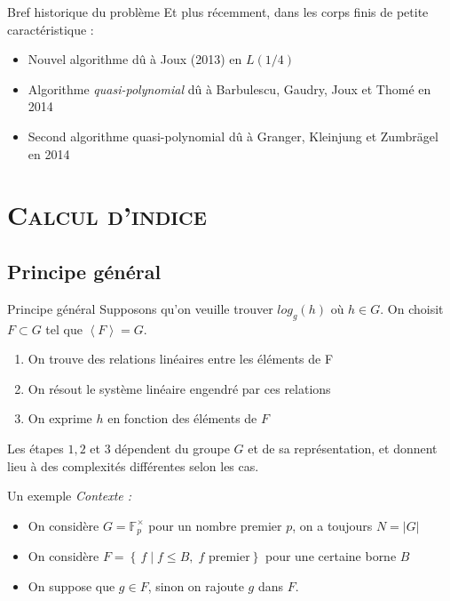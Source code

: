 \documentclass[xcolor=x11names,compress]{beamer}
\theoremstyle{break}
\theoremstyle{sc}
\theoremstyle{definition}
\theoremstyle{remark}
\begin{document}
\begin{frame}{Bref historique du problème}
  Et plus récemment, dans les corps finis de petite caractéristique :
  \begin{itemize}
    \item Nouvel algorithme dû à Joux (2013) en $L(1/4)$
    \item Algorithme \emph{quasi-polynomial} dû à Barbulescu, Gaudry, Joux et
      Thomé en 2014
    \item Second algorithme quasi-polynomial dû à Granger, Kleinjung et
      Zumbrägel en 2014
  \end{itemize}
\end{frame}

\section{\scshape Calcul d'indice}
\subsection{Principe général}
\begin{frame}{Principe général}
  Supposons qu'on veuille trouver $log_g(h)$ où $h\in G$. On choisit $F\subset G$ tel que $\left\langle F \right\rangle = G$.
  \begin{enumerate}
    \item On trouve des relations linéaires entre les éléments de F
    \item On résout le système linéaire engendré par ces relations
    \item On exprime $h$ en fonction des éléments de $F$
  \end{enumerate}
  Les étapes $1, 2$ et $3$ dépendent du groupe $G$ et de sa représentation, et
  donnent lieu à des complexités différentes selon les cas.
\end{frame}
\begin{frame}{Un exemple}
  \emph{Contexte :}
  \begin{itemize}
    \item On considère $G = \mathbb{F}_p^\times$ pour un nombre premier $p$, on
      a toujours $N = |G|$
    \item On considère $F = \left\{\, f \;|\; f \leq B,\; f \text{ premier} \right\}$ pour
      une certaine borne $B$
    \item On suppose que $g\in F$, sinon on rajoute $g$ dans $F$.
  \end{itemize}
\end{frame}
\end{document}
